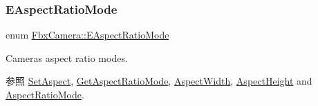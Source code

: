 \subsubsection{\texorpdfstring{E\+Aspect\+Ratio\+Mode}{EAspectRatioMode}}
{\footnotesize\ttfamily enum \hyperlink{class_fbx_camera_a2135478bb5fd6985835c14b11e1fccda}{Fbx\+Camera\+::\+E\+Aspect\+Ratio\+Mode}}

Camera\textquotesingle{}s aspect ratio modes. \begin{DoxySeeAlso}{参照}
\hyperlink{class_fbx_camera_adb9cf67e4b59463add6a052003797392}{Set\+Aspect}, \hyperlink{class_fbx_camera_ad60e1323bdb9f349dbb96e5d8bdf716a}{Get\+Aspect\+Ratio\+Mode}, \hyperlink{class_fbx_camera_ada3746eb834815c224eb5fc223fa35ac}{Aspect\+Width}, \hyperlink{class_fbx_camera_aabeade4a36213c65d7a4f45aeceebff6}{Aspect\+Height} and \hyperlink{class_fbx_camera_ad140535acab4a663a6f4cb51ef603e7a}{Aspect\+Ratio\+Mode}. 
\end{DoxySeeAlso}
